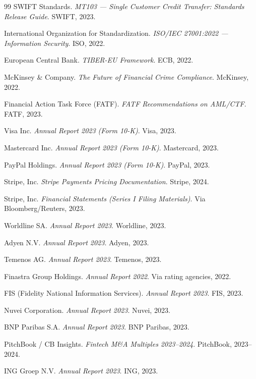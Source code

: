 \documentclass[11pt,a4paper]{article}
\begin{document}
\begin{thebibliography}{99}
SWIFT Standards.
\textit{MT103 --- Single Customer Credit Transfer: Standards Release Guide}.
SWIFT, 2023.

International Organization for Standardization.
\textit{ISO/IEC 27001:2022 --- Information Security}.
ISO, 2022.

European Central Bank.
\textit{TIBER-EU Framework}.
ECB, 2022.

McKinsey \& Company.
\textit{The Future of Financial Crime Compliance}.
McKinsey, 2022.

Financial Action Task Force (FATF).
\textit{FATF Recommendations on AML/CTF}.
FATF, 2023.

Visa Inc. \textit{Annual Report 2023 (Form 10-K)}. Visa, 2023.

Mastercard Inc. \textit{Annual Report 2023 (Form 10-K)}. Mastercard, 2023.

PayPal Holdings. \textit{Annual Report 2023 (Form 10-K)}. PayPal, 2023.

Stripe, Inc. \textit{Stripe Payments Pricing Documentation}. Stripe, 2024.

Stripe, Inc. \textit{Financial Statements (Series I Filing Materials)}. Via Bloomberg/Reuters, 2023.

Worldline SA. \textit{Annual Report 2023}. Worldline, 2023.

Adyen N.V. \textit{Annual Report 2023}. Adyen, 2023.

Temenos AG. \textit{Annual Report 2023}. Temenos, 2023.

Finastra Group Holdings. \textit{Annual Report 2022}. Via rating agencies, 2022.

FIS (Fidelity National Information Services). \textit{Annual Report 2023}. FIS, 2023.

Nuvei Corporation. \textit{Annual Report 2023}. Nuvei, 2023.

BNP Paribas S.A. \textit{Annual Report 2023}. BNP Paribas, 2023.

PitchBook / CB Insights. \textit{Fintech M\&A Multiples 2023--2024}. PitchBook, 2023--2024.

ING Groep N.V. \textit{Annual Report 2023}. ING, 2023.


\end{thebibliography}
\end{document}
